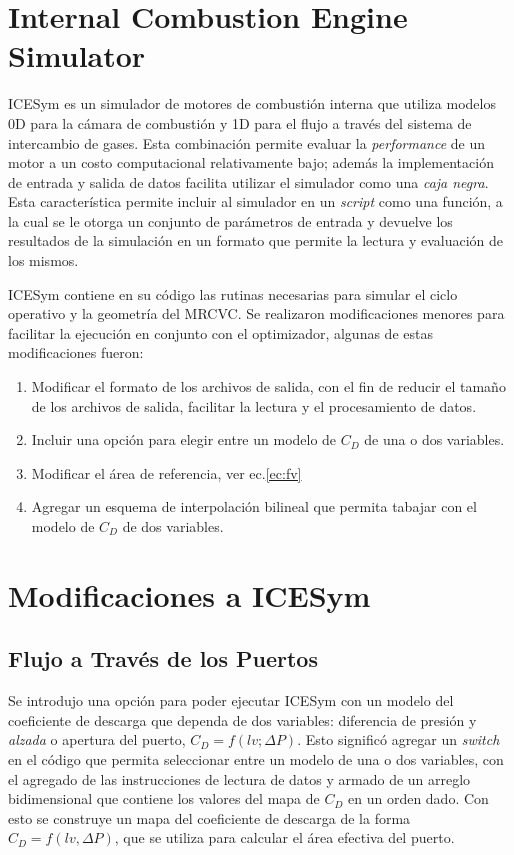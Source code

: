 \section{Internal Combustion Engine Simulator}
%
ICESym es un simulador de motores de combustión interna que  utiliza modelos 0D
para la cámara de combustión y 1D para el flujo a través del sistema de
intercambio de gases.
%
Esta combinación permite evaluar la \emph{performance} de un motor a un costo
computacional relativamente bajo; además la implementación de entrada y salida
de datos facilita utilizar el simulador como una \emph{caja negra}.
%
Esta característica permite incluir al simulador en un \emph{script} como una
función, a la cual se le otorga un conjunto de parámetros de entrada y devuelve
los resultados de la simulación en un formato que permite la lectura y
evaluación de los mismos.

ICESym contiene en su código las rutinas necesarias para simular el ciclo
operativo y la geometría del MRCVC.
%
Se realizaron modificaciones menores para facilitar la ejecución en conjunto con
el optimizador, algunas de estas modificaciones fueron:
%
\begin{enumerate}
    \item Modificar el formato de los archivos de salida, con el fin de reducir
el tamaño de los archivos de salida, facilitar la lectura y el procesamiento de
datos.
    \item Incluir una opción para elegir entre un modelo de $C_D$ de una o dos
variables.
    \item Modificar el área de referencia, ver ec.\ref{ec:fv}
    \item Agregar un esquema de interpolación bilineal que permita tabajar con
el modelo de $C_{D}$ de dos variables.
\end{enumerate}


\section{Modificaciones a ICESym}
\subsection{Flujo a Través de los Puertos}
%
Se introdujo una opción para poder ejecutar ICESym con un modelo del coeficiente
de descarga que dependa de dos variables: diferencia de presión y \emph{alzada}
o apertura del puerto, $C_D = f(lv; \Delta P)$.
%
Esto significó agregar un \emph{switch} en el código que permita seleccionar
entre un modelo de una o dos variables, con el agregado de las instrucciones de
lectura de datos y armado de un arreglo bidimensional que contiene los valores
del mapa de $C_{D}$ en un orden dado.
%
Con esto se construye un mapa del coeficiente de descarga de la forma $C_D =
f(lv, \Delta P)$, que se utiliza para calcular el área efectiva del puerto.

